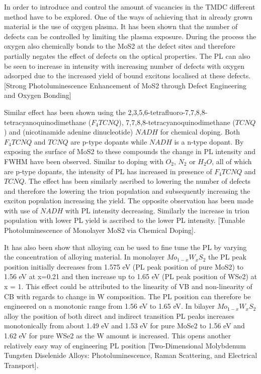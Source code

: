 \documentclass[12pt]{article}
\begin{document}
	In order to introduce and control the amount of vacancies in the TMDC different method have to be explored. One of the ways of achieving that in already grown material is the use of oxygen plasma. It has been shown that the number of defects can be controlled by limiting the plasma exposure. During the process the oxygen also chemically bonds to the MoS2 at the defect sites and therefore partially negates the effect of defects on the optical properties. The PL can also be seen to increase in intensity with increasing number of defects with oxygen adsorped due to the increased yield of bound excitons localised at these defects. [Strong Photoluminescence Enhancement of MoS2 through Defect Engineering and Oxygen Bonding]
	
	Similar effect has been shown using the 2,3,5,6-tetrafluoro-7,7,8,8-tetracyanoquinodimethane ($F_4TCNQ$), 7,7,8,8-tetracyanoquinodimethane ($TCNQ$) and (nicotinamide adenine dinucleotide) $NADH$ for chemical doping. Both $F_4TCNQ$ and $TCNQ$ are p-type dopants while $NADH$ is a n-type dopant. By exposing the surface of MoS2 to these compounds the change in PL intensity and FWHM have been observed. Similar to doping with $O_2$, $N_2$ or $H_2O$, all of which are p-type dopants, the intensity of PL has increased in presence of $F_4TCNQ$ and $TCNQ$. The effect has been similarly ascribed to lowering the number of defects and therefore the lowering the trion population and subsequently increasing the exciton population increasing the yield. The opposite observation has been made with use of $NADH$ with PL intensity decreasing. Similarly the increase in trion population with lower PL yield is ascribed to the lower PL intensity. [Tunable Photoluminescence of Monolayer MoS2 via Chemical Doping].
	
	It has also been show that alloying can be used to fine tune the PL by varying the concentration of alloying material. In monolayer $Mo_{1-x}W_xS_2$ the PL peak position initially decreases from 1.575 eV (PL peak position of pure MoS2) to 1.56 eV at x=0.21 and then increase up to 1.65 eV (PL peak position of WSe2) at x = 1. This effect could be attributed to the linearity of VB and non-linearity of CB with regards to change in W composition. The PL position can therefore be engineered on a monotonic range from 1.56 eV to 1.65 eV. In bilayer $Mo_{1-x}W_xS_2$ alloy the position of both direct and indirect transition PL peaks increases monotonically from about 1.49 eV and 1.53 eV for pure MoSe2 to 1.56 eV and 1.62 eV for pure WSe2 as the W amount is increased. This opens another relatively easy way of engineering PL position [Two-Dimensional Molybdenum Tungsten Diselenide Alloys: Photoluminescence, Raman Scattering, and Electrical Transport].
	
\end{document}
